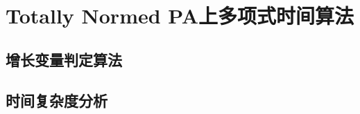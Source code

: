 \chapter{Totally Normed PA上多项式时间算法}
\label{chap:tnpa-alg}

\section{增长变量判定算法}
\label{sec:grow-alg}

\section{时间复杂度分析}
\label{sec:complexity}

